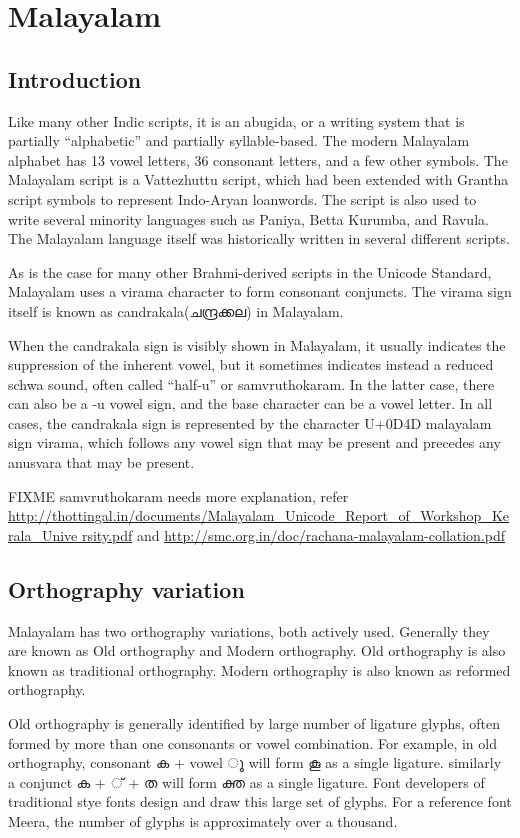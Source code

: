\chapter{Malayalam}
\section{Introduction}

Like many other Indic scripts, it is an abugida, or a writing system
that is partially “alphabetic” and partially syllable-based. The
modern Malayalam alphabet has 13 vowel letters, 36 consonant letters,
and a few other symbols. The Malayalam script is a Vattezhuttu script,
which had been extended with Grantha script symbols to represent
Indo-Aryan loanwords. The script is also used to write several
minority languages such as Paniya, Betta Kurumba, and Ravula. The
Malayalam language itself was historically written in several
different scripts.

As is the case for many other Brahmi-derived scripts in the Unicode
Standard, Malayalam uses a virama character to form consonant
conjuncts. The virama sign itself is known as candrakala({\meera ചന്ദ്രക്കല}) in
Malayalam.

When the candrakala sign is visibly shown in Malayalam, it usually
indicates the suppression of the inherent vowel, but it sometimes
indicates instead a reduced schwa sound, often called “half-u” or
samvruthokaram. In the latter case, there can also be a -u vowel sign,
and the base character can be a vowel letter. In all cases, the
candrakala sign is represented by the character U+0D4D malayalam sign
virama, which follows any vowel sign that may be present and precedes
any anusvara that may be present.

FIXME samvruthokaram needs more explanation, refer
{\url{
http://thottingal.in/documents/Malayalam_Unicode_Report_of_Workshop_Kerala_Unive
rsity.pdf}}
and {\url{http://smc.org.in/doc/rachana-malayalam-collation.pdf}}

\section{Orthography variation}

Malayalam has two orthography variations, both actively
used. Generally they are known as Old orthography and Modern
orthography. Old orthography is also known as traditional
orthography. Modern orthography is also known as reformed orthography.

Old orthography is generally identified by large number of ligature
glyphs, often formed by more than one consonants or vowel
combination. For example, in old orthography, consonant {\meera ക} +
vowel { \meera ൂ} will form {\meera കൂ} as a single ligature. similarly a
conjunct {\meera ക + ് + ത} will form {\meera ക്ത} as a single
ligature. Font developers of traditional stye fonts design and draw
this large set of glyphs. For a reference font Meera, the number of
glyphs is approximately over a thousand.

